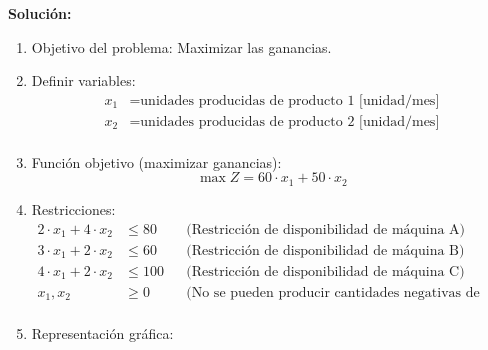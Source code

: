 \documentclass[../main.tex]{subfiles}
\begin{document}
\begin{exercise}
            \textbf{Solución:}
            \begin{enumerate}
                \item Objetivo del problema: Maximizar las ganancias.
                \item Definir variables:
                    \begin{equation}
                        \begin{split}
                            x_1 &= \text{unidades producidas de producto 1 [unidad/mes]} \\
                            x_2 &= \text{unidades producidas de producto 2 [unidad/mes]} \\
                        \end{split}
                    \end{equation}
                \item Función objetivo (maximizar ganancias):
                    \begin{equation}
                        \max Z = 60 \cdot x_1 + 50 \cdot x_2
                    \end{equation}
                \item Restricciones:
                    \begin{equation}
                        \begin{aligned}
                            2 \cdot x_1 + 4 \cdot x_2 &\leq 80 && \text{(Restricción de disponibilidad de máquina A)} \\
                            3 \cdot x_1 + 2 \cdot x_2 &\leq 60 && \text{(Restricción de disponibilidad de máquina B)}\\
                            4 \cdot x_1 + 2 \cdot x_2 &\leq 100 && \text{(Restricción de disponibilidad de máquina C)}\\
                            x_1, x_2 & \geq 0 && \text{(No se pueden producir cantidades negativas de productos)}\\
                        \end{aligned}
                    \end{equation}
                \item Representación gráfica:
                    \begin{figure}[ht]
                        \centering

\end{figure}
\end{enumerate}
\end{exercise}
\end{document}
